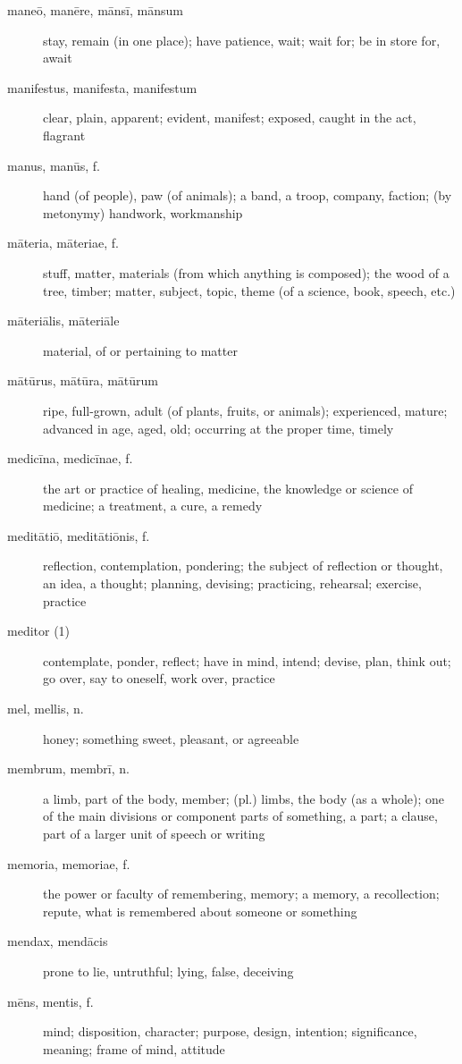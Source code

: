 \begin{description}
    \item[maneō, manēre, mānsī, mānsum] \marginnote{*}stay, remain (in one place); have patience, wait; wait for; be in store for, await
    \item[manifestus, manifesta, manifestum] clear, plain, apparent; evident, manifest; exposed, caught in the act, flagrant
    \item[manus, manūs, f.] \marginnote{*}hand (of people), paw (of animals); a band, a troop, company, faction; (by metonymy) handwork, workmanship
    \item[māteria, māteriae, f.]  stuff, matter, materials (from which anything is composed); the wood of a tree, timber; matter, subject, topic, theme (of a science, book, speech, etc.)
    \item[māteriālis, māteriāle]  material, of or pertaining to matter
    \item[mātūrus, mātūra, mātūrum] ripe, full-grown, adult (of plants, fruits, or animals); experienced, mature; advanced in age, aged, old; occurring at the proper time, timely
    \item[medicīna, medicīnae, f.] the art or practice of healing, medicine, the knowledge or science of medicine; a treatment, a cure, a remedy
    \item[meditātiō, meditātiōnis, f.] \marginnote{*}reflection, contemplation, pondering; the subject of reflection or thought, an idea, a thought; planning, devising; practicing, rehearsal; exercise, practice
    \item[meditor (1)] contemplate, ponder, reflect; have in mind, intend; devise, plan, think out; go over, say to oneself, work over, practice
    \item[mel, mellis, n.] honey; something sweet, pleasant, or agreeable
    \item[membrum, membrī, n.] \marginnote{*}a limb, part of the body, member; (pl.) limbs, the body (as a whole); one of the main divisions or component parts of something, a part; a clause, part of a larger unit of speech or writing
    \item[memoria, memoriae, f.] \marginnote{*}the power or faculty of remembering, memory; a memory, a recollection; repute, what is remembered about someone or something
    \item[mendax, mendācis] prone to lie, untruthful; lying, false, deceiving
    \item[mēns, mentis, f.] \marginnote{*}mind; disposition, character; purpose, design, intention; significance, meaning; frame of mind, attitude

\end{description}
